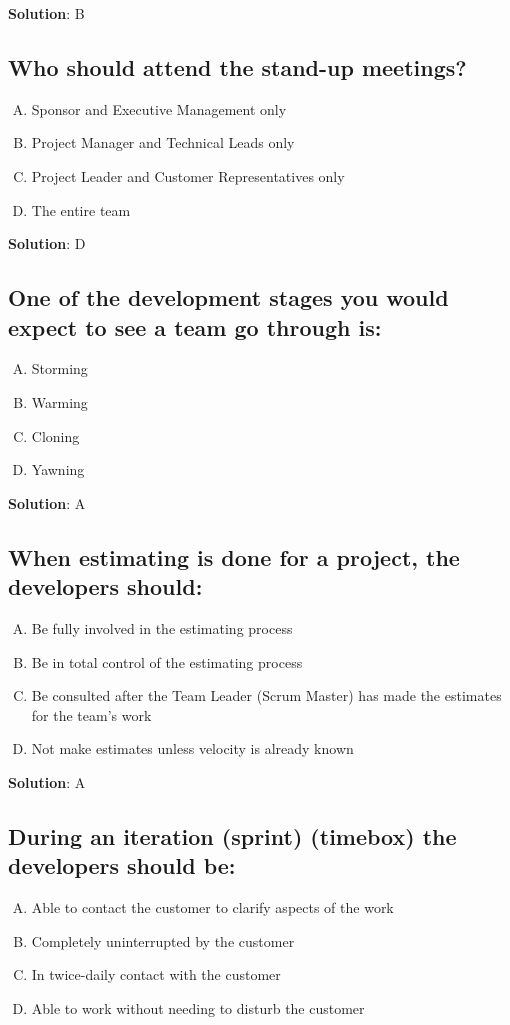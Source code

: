 \textbf{Solution}: B


\subsection{Who should attend the stand-up meetings?}
\begin{enumerate}[A)]
  \item Sponsor and Executive Management only
  \item Project Manager and Technical Leads only
  \item Project Leader and Customer Representatives only
  \item The entire team
\end{enumerate}

\textbf{Solution}: D


\subsection{One of the development stages you would expect to see a team go through is:}
\begin{enumerate}[A)]
  \item Storming
  \item Warming
  \item Cloning
  \item Yawning
\end{enumerate}

\textbf{Solution}: A


\subsection{When estimating is done for a project, the developers should:}
\begin{enumerate}[A)]
  \item Be fully involved in the estimating process
  \item Be in total control of the estimating process
  \item Be consulted after the Team Leader (Scrum Master) has made the estimates for the team’s work
  \item Not make estimates unless velocity is already known
\end{enumerate}

\textbf{Solution}: A


\subsection{During an iteration (sprint) (timebox) the developers should be:}
\begin{enumerate}[A)]
  \item Able to contact the customer to clarify aspects of the work
  \item Completely uninterrupted by the customer
  \item In twice-daily contact with the customer
  \item Able to work without needing to disturb the customer
\end{enumerate}

